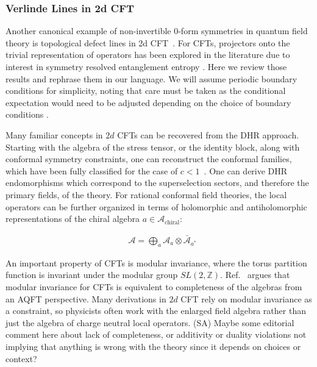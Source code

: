 \documentclass{article}
\newcommand{\mA}{\mathcal{A}}
\theoremstyle{definition}
\newcommand{\SA}[1]{{\color{sulaiman}\footnotesize{(SA) #1}}}
\begin{document}
  \subsubsection{Verlinde Lines in 2d CFT}

  Another canonical example of non-invertible 0-form symmetries in quantum field
  theory is topological defect lines in 2d CFT~\cite{shao2019tdlrgflow, shao2024whatsundonetasilectures}.
  For CFTs, projectors onto the trivial representation of operators has been
  explored in the literature due to interest in symmetry resolved entanglement
  entropy \cite{tachikawa2023asymptoticdos,bastidadas2024catsree}. Here we review
  those results and rephrase them in our language. We will assume periodic
  boundary conditions for simplicity, noting that care must be taken as the conditional
  expectation would need to be adjusted depending on the choice of boundary conditions
  \cite{heymann2025revisitingsrefornis}.

  Many familiar concepts in $2d$ CFTs can be recovered from the DHR approach.
  Starting with the algebra of the stress tensor, or the identity block, along
  with conformal symmetry constraints, one can reconstruct the conformal families, which have been fully classified for the case of $c<1$~\cite{Kawahigashiclassificationlocalconformalnets}. One can derive DHR endomorphisms which correspond to the superselection sectors, and therefore the primary fields, of the theory. For rational conformal field theories, the local operators
  can be further organized in terms of holomorphic and antiholomorphic representations of the chiral algebra $a\in\mA_{\text{chiral}}$:

  \begin{eqnarray}
    &\mathcal{A} = \bigoplus_a\mathcal{A}_a\otimes \bar{\mathcal{A}}_{a^*}
  \end{eqnarray}

  An important property of CFTs is modular invariance, where the torus partition
  function is invariant under the modular group $SL(2, \mathbb{Z})$. Ref.~\cite{casinietal2024modular}
  argues that modular invariance for CFTs is equivalent to completeness of the algebras
  from an AQFT perspective. Many derivations in $2d$ CFT rely on modular
  invariance as a constraint, so physicists often work with the enlarged field algebra
  rather than just the algebra of charge neutral local operators. \SA{Maybe some editorial comment here about lack of completeness, or additivity or duality violations not implying that anything is wrong with the theory since it depends on choices or context?}
\end{document}
